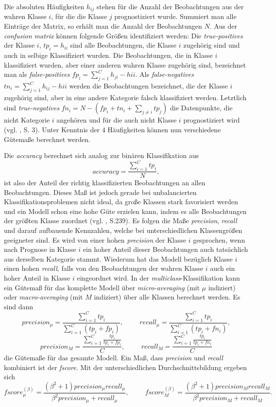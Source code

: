 \documentclass[a4paper,11pt]{article}
\begin{document}
Die absoluten Häufigkeiten $h_{ij}$ stehen für die Anzahl der Beobachtungen aus der wahren Klasse $i$, für die die Klasse $j$ prognostiziert wurde. Summiert man alle Einträge der Matrix, so erhält man die Anzahl der Beobachtungen $N$. Aus der \textit{confusion matrix} können folgende Größen identifiziert werden: Die \textit{true-positives} der Klasse $i$, $tp_i = h_{ii}$ sind alle Beobachtungen, die Klasse $i$ zugehörig sind und auch in selbige Klassifiziert wurden. Die Beobachtungen, die in Klasse $i$ klassifiziert wurden, aber einer anderen wahren Klasse zugehörig sind, bezeichnet man als \textit{false-positives} $fp_i = \sum_{j = 1}^C h_{ji} - h{ii}$. Als \textit{false-negatives} $tn_i = \sum_{j = 1}^C h_{ij} - h{ii}$ werden die Beobachtungen bezeichnet, die der Klasse $i$ zugehörig sind, aber in eine andere Kategorie falsch klassifiziert werden. Letztlich sind \textit{true-negatives} $fn_i = N - (fp_i + tn_i + \sum_{j \neq i} tp_j)$ die Datenpunkte, die nicht Kategorie $i$ angehören und für die auch nicht Klasse $i$ prognostiziert wird (vgl. \cite{sokolova}, S. 3). Unter Kenntnis der $4$ Häufigkeiten können nun verschiedene Gütemaße berechnet werden. 


Die \textit{accuracy} berechnet sich analog zur binären Klassifikation aus 
\[ accuracy = \frac{\sum_{i=1}^C tp_i}{N},  \]
ist also der Anteil der richtig klassifizierten Beobachtungen an allen Beobachtungen. Dieses Maß ist jedoch gerade bei unbalancierten Klassifikationsproblemen nicht ideal, da große Klassen stark favorisiert werden und ein Modell schon eine hohe Güte erzielen kann, indem es alle Beobachtungen der größten Klasse zuordnet (vgl. \cite{backhaus}, S.239). Es folgen die Maße \textit{precision}, \textit{recall} und darauf aufbauende Kennzahlen, welche bei unterschiedlichen Klassengrößen geeigneter sind. Es wird von einer hohen \textit{precision} der Klasse $i$ gesprochen, wenn nach Prognose in Klasse $i$ ein hoher Anteil dieser Beobachtungen auch tatsächlich aus derselben Kategorie stammt. Wiederum hat das Modell bezüglich Klasse $i$ einen hohen \textit{recall}, falls von den Beobachtungen der wahren Klasse $i$ auch ein hoher Anteil in Klasse $i$ eingeordnet wird.
In der \textit{multiclass}-Klassifikation kann ein Gütemaß für das komplette Modell über \textit{micro-averaging} (mit $\mu$ indiziert) oder \textit{macro-averaging} (mit $M$ indiziert) über alle Klassen berechnet werden. Es sind dann 
\[ precision_{\mu} = \frac{\sum_{i = 1}^C tp_i}{\sum_{i = 1}^C (tp_i + fp_i)}, \hspace{1cm} recall_{\mu} = \frac{\sum_{i = 1}^C tp_i}{\sum_{i = 1}^C (tp_i + fn_i)},\]
\[ precision_M = \frac{\sum_{i = 1}^C \frac{tp_i}{tp_i + fp_i} }{C}, \hspace{1cm} recall_M = \frac{\sum_{i = 1}^C \frac{tp_i}{tp_i + fn_i} }{C}\]
die Gütemaße für das gesamte Modell. Ein Maß, dass \textit{precision} und \textit{recall} kombiniert ist der \textit{fscore}. Mit der unterschiedlichen Durchschnittsbildung ergeben sich
\[ fscore_{\mu}^{(\beta)} = \frac{(\beta^2+1) precision_{\mu} recall_{\mu}}{\beta^2 precision_{\mu}+ recall_{\mu}}, \hspace{1cm} fscore_{M}^{(\beta)} = \frac{(\beta^2+1) precision_{M} recall_{M}}{\beta^2 precision_{M}+ recall_{M}} . \]
\end{document}
